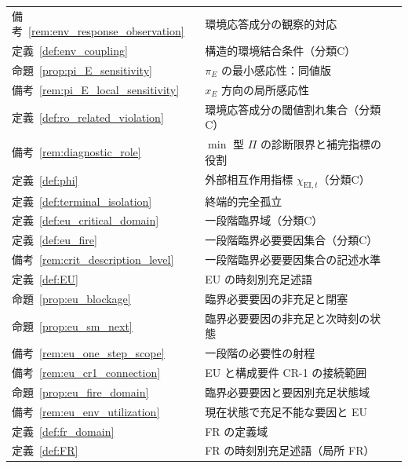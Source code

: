 \begin{longtable}{p{2.4cm} p{10.4cm} r}
備考~\ref{rem:env_response_observation} & 環境応答成分の観察的対応 & \pageref{rem:env_response_observation} \\
定義~\ref{def:env_coupling} & 構造的環境結合条件（分類C） & \pageref{def:env_coupling} \\
命題~\ref{prop:pi_E_sensitivity} & $\pi_E$ の最小感応性：同値版 & \pageref{prop:pi_E_sensitivity} \\
備考~\ref{rem:pi_E_local_sensitivity} & $x_E$ 方向の局所感応性 & \pageref{rem:pi_E_local_sensitivity} \\
定義~\ref{def:ro_related_violation} & 環境応答成分の閾値割れ集合（分類C） & \pageref{def:ro_related_violation} \\
備考~\ref{rem:diagnostic_role} & $\min$ 型 $\Pi$ の診断限界と補完指標の役割 & \pageref{rem:diagnostic_role} \\
定義~\ref{def:phi} & 外部相互作用指標 $\chi_{\mathrm{EI},t}$（分類C） & \pageref{def:phi} \\
定義~\ref{def:terminal_isolation} & 終端的完全孤立 & \pageref{def:terminal_isolation} \\
定義~\ref{def:eu_critical_domain} & 一段階臨界域（分類C） & \pageref{def:eu_critical_domain} \\
定義~\ref{def:eu_fire} & 一段階臨界必要要因集合（分類C） & \pageref{def:eu_fire} \\
備考~\ref{rem:crit_description_level} & 一段階臨界必要要因集合の記述水準 & \pageref{rem:crit_description_level} \\
定義~\ref{def:EU} & EU の時刻別充足述語 & \pageref{def:EU} \\
命題~\ref{prop:eu_blockage} & 臨界必要要因の非充足と閉塞 & \pageref{prop:eu_blockage} \\
命題~\ref{prop:eu_sm_next} & 臨界必要要因の非充足と次時刻の状態 & \pageref{prop:eu_sm_next} \\
備考~\ref{rem:eu_one_step_scope} & 一段階の必要性の射程 & \pageref{rem:eu_one_step_scope} \\
備考~\ref{rem:eu_cr1_connection} & EU と構成要件 CR-1 の接続範囲 & \pageref{rem:eu_cr1_connection} \\
命題~\ref{prop:eu_fire_domain} & 臨界必要要因と要因別充足状態域 & \pageref{prop:eu_fire_domain} \\
備考~\ref{rem:eu_env_utilization} & 現在状態で充足不能な要因と EU & \pageref{rem:eu_env_utilization} \\
定義~\ref{def:fr_domain} & FR の定義域 & \pageref{def:fr_domain} \\
定義~\ref{def:FR} & FR の時刻別充足述語（局所 FR） & \pageref{def:FR} \\

\end{longtable}
